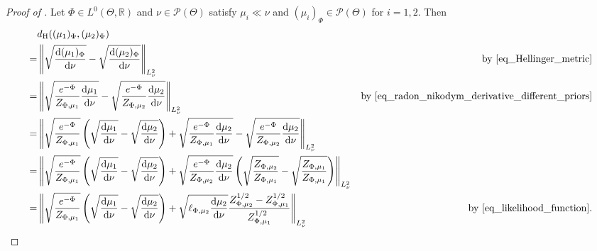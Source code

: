 \documentclass[a4paper]{scrartcl}
\theoremstyle{definition}
\numberwithin{equation}{section}
\newcommand{\R}{\mathbb{R}}
\newcommand{\rd}{\mathrm{d}}
\newcommand{\Norm}[1]{\left\Vert #1 \right\Vert}
\newcommand{\Hel}[0]{\textup{H}}
\begin{document}
\HellingerboundsPriorperturbationsTriangle*
\begin{proof}[Proof of ]
 
Let $\Phi\in L^0(\Theta,\R)$ and $\nu\in\mathcal{P}(\Theta)$ satisfy $\mu_i\ll \nu$ and $(\mu_i)_{\Phi}\in\mathcal{P}(\Theta)$ for $i=1,2$.
 Then
 \begin{align}
  &d_{\Hel}((\mu_1)_\Phi,(\mu_2)_\Phi)
     \nonumber
     \\
  =& \Norm{\sqrt{\frac{\rd(\mu_1)_\Phi}{\rd\nu}}-\sqrt{\frac{\rd(\mu_2)_\Phi}{\rd\nu}}}_{L^2_\nu} & \text{by \eqref{eq_Hellinger_metric}}
     \nonumber
     \\
   =& \Norm{\sqrt{\frac{e^{-\Phi}}{Z_{\Phi,\mu_1}}\frac{\rd\mu_1}{\rd\nu}} -\sqrt{\frac{e^{-\Phi}}{Z_{\Phi,\mu_2}}\frac{\rd\mu_2}{\rd\nu}}}_{L^2_\nu} & \text{by \eqref{eq_radon_nikodym_derivative_different_priors}}
   \nonumber
   \\
   =&\Norm{\sqrt{\frac{e^{-\Phi}}{Z_{\Phi,\mu_1}}}\left(\sqrt{\frac{\rd\mu_1}{\rd\nu}}-\sqrt{\frac{\rd\mu_2}{\rd\nu}}\right)+\sqrt{\frac{e^{-\Phi}}{Z_{\Phi,\mu_1}}\frac{\rd\mu_2}{\rd\nu}} -\sqrt{\frac{e^{-\Phi}}{Z_{\Phi,\mu_2}}\frac{\rd\mu_2}{\rd\nu}}}_{L^2_\nu}
   \nonumber
   \\
   =&\Norm{\sqrt{\frac{e^{-\Phi}}{Z_{\Phi,\mu_1}}}\left(\sqrt{\frac{\rd\mu_1}{\rd\nu}}-\sqrt{\frac{\rd\mu_2}{\rd\nu}}\right)+\sqrt{\frac{e^{-\Phi}}{Z_{\Phi,\mu_2}}\frac{\rd\mu_2}{\rd\nu}}\left(\sqrt{\frac{Z_{\Phi,\mu_2}}{Z_{\Phi,\mu_1}}} -\sqrt{\frac{Z_{\Phi,\mu_1}}{Z_{\Phi,\mu_1}}}\right)}_{L^2_\nu}
   \nonumber
   \\
   =&\Norm{\sqrt{\frac{e^{-\Phi}}{Z_{\Phi,\mu_1}}}\left(\sqrt{\frac{\rd\mu_1}{\rd\nu}}-\sqrt{\frac{\rd\mu_2}{\rd\nu}}\right)+\sqrt{\ell_{\Phi,\mu_2}\frac{\rd\mu_2}{\rd\nu}} \frac{Z_{\Phi,\mu_2}^{1/2}-Z_{\Phi,\mu_1}^{1/2}}{Z_{\Phi,\mu_1}^{1/2} }}_{L^2_\nu}
   &\text{by \eqref{eq_likelihood_function}.} 
   \label{eq_Hellinger_metric_different_priors}
\end{align}


\end{proof}
\end{document}
